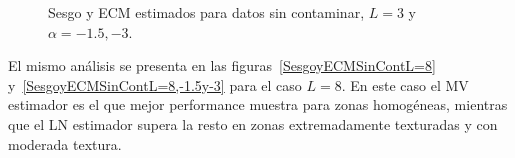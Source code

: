 \begin{figure}[H]
	\caption{\label{SesgoyECMSinContL=3,-1.5y-3}\small Sesgo y ECM estimados para datos sin contaminar, $ L=3$ y $\alpha=-1.5, -3$.}
\end{figure}

El mismo análisis se presenta en las figuras~\ref{SesgoyECMSinContL=8} y~\ref{SesgoyECMSinContL=8,-1.5y-3} para el caso $L=8$. En este caso el MV estimador es el que mejor performance muestra para zonas homogéneas, mientras que el LN estimador supera la resto en zonas extremadamente texturadas y con moderada textura.

